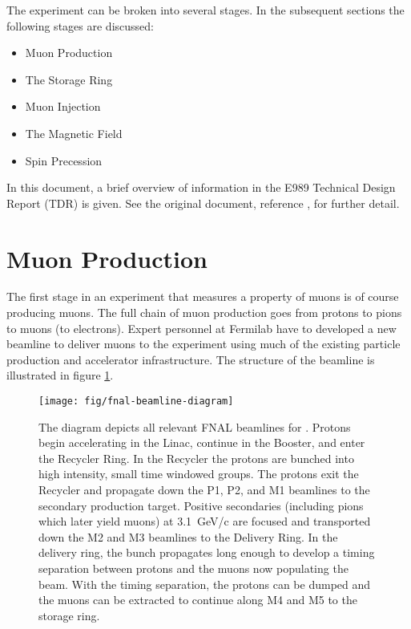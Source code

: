 The \mugmtwo experiment can be broken into several stages.  In the subsequent sections the following stages are discussed:

\begin{itemize}[noitemsep]
\item{Muon Production}
\item{The Storage Ring}
\item{Muon Injection}
\item{The Magnetic Field}
\item{Spin Precession}
\end{itemize}

\noindent
In this document, a brief overview of information in the E989 Technical Design Report (TDR) is given. See the original document, reference \cite{e989-tdr}, for further detail. 

\section{Muon Production} \label{sec:muon-production}

The first stage in an experiment that measures a property of muons is of course producing muons. The full chain of muon production goes from protons to pions to muons (to electrons).  Expert personnel at Fermilab have to developed a new beamline to deliver muons to the \gmtwo experiment using much of the existing particle production and accelerator infrastructure.  The structure of the beamline is illustrated in figure \ref{fig:fnal-beamline-diagram}.


\begin{figure}
\texttt{[image: fig/fnal-beamline-diagram]}
\caption{
    The diagram depicts all relevant FNAL beamlines for \gmtwo.  Protons begin accelerating in the Linac, continue in the Booster, and enter the Recycler Ring. In the Recycler the protons are bunched into high intensity, small time windowed groups.  The protons exit the Recycler and propagate down the P1, P2, and M1 beamlines to the secondary production target.  Positive secondaries (including pions which later yield muons) at \SI{3.1}{\GeV/c} are focused and transported down the M2 and M3 beamlines to the Delivery Ring.  In the delivery ring, the bunch propagates long enough to develop a timing separation between protons and the muons now populating the beam.  With the timing separation, the protons can be dumped and the muons can be extracted to continue along M4 and M5 to the \gmtwo storage ring. 
    \label{fig:fnal-beamline-diagram}
}
\end{figure}


